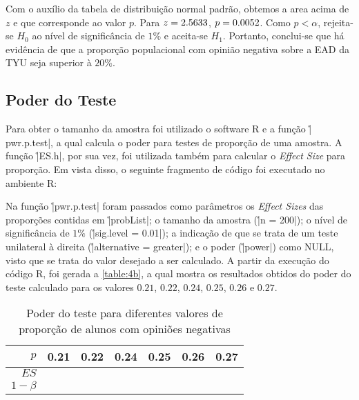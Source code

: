 	Com o auxílio da tabela de distribuição normal padrão, obtemos a area acima de $z$ e que corresponde 
	ao valor $p$. Para $z = \num{2.5633}$, $p = \num{0.0052}$. Como $p < \alpha$, rejeita-se $H_0$ ao nível
	de significância de $1\%$ e aceita-se $H_1$. Portanto, conclui-se que há evidência de que a proporção
	populacional com opinião negativa sobre a EAD da TYU seja superior à $20\%$.

\subsection{Poder do Teste}
\label{questao:4b}

	Para obter o tamanho da amostra foi utilizado o software R e a função \r|pwr.p.test|, a qual calcula o poder para testes de proporção de uma amostra.
	A função \r|ES.h|, por sua vez, foi utilizada também para calcular o \textit{Effect Size} para proporção.
	Em vista disso, o seguinte fragmento de código foi executado no ambiente R:


	Na função \r|pwr.p.test| foram passados como parâmetros os \textit{Effect Sizes} das proporções contidas em \r|probList|;
	o tamanho da amostra (\r|n = 200|); 
	o nível de significância de $1\%$ (\r|sig.level = 0.01|);
	a indicação de que se trata de um teste unilateral à direita (\r|alternative = greater|); 
	e o poder (\r|power|) como NULL, visto que se trata do valor desejado a ser calculado.
	A partir da execução do código R, foi gerada a \autoref{table:4b}, a qual mostra os resultados obtidos do poder do teste calculado para os valores $0.21$, $0.22$,  $0.24$, $0.25$, $0.26$ e $0.27$.

	\begin{table}[ht]
	\centering
	\caption{Poder do teste para diferentes valores de proporção de alunos com opiniões negativas} 
	\label{table:4b}
	\begin{tabular}{rrrrrrr}
		\toprule
		$p$ 	& 0.21 & 0.22 & 0.24 & 0.25 & 0.26 & 0.27 \\ 
		\midrule
		$ES$ 	& \QUATROesVinteUm & \QUATROesVinteDois & \QUATROesVinteQuatro & \QUATROesVinteCinco & \QUATROesVinteSeis & \QUATROesVinteSete \\ 
		$1 - \beta$ & \QUATROpVinteUm & \QUATROpVinteDois & \QUATROpVinteQuatro & \QUATROpVinteCinco & \QUATROpVinteSeis & \QUATROpVinteSete \\ 
	   \bottomrule
	\end{tabular}
	\end{table}

